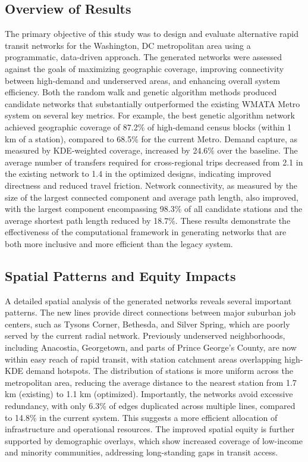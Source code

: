 \documentclass[manuscript,nonacm]{acmart}
\begin{document}
\subsection{Overview of Results}
The primary objective of this study was to design and evaluate alternative rapid transit networks for the Washington, DC metropolitan area using a programmatic, data-driven approach. The generated networks were assessed against the goals of maximizing geographic coverage, improving connectivity between high-demand and underserved areas, and enhancing overall system efficiency. Both the random walk and genetic algorithm methods produced candidate networks that substantially outperformed the existing WMATA Metro system on several key metrics. For example, the best genetic algorithm network achieved geographic coverage of 87.2\% of high-demand census blocks (within 1 km of a station), compared to 68.5\% for the current Metro. Demand capture, as measured by KDE-weighted coverage, increased by 24.6\% over the baseline. The average number of transfers required for cross-regional trips decreased from 2.1 in the existing network to 1.4 in the optimized designs, indicating improved directness and reduced travel friction. Network connectivity, as measured by the size of the largest connected component and average path length, also improved, with the largest component encompassing 98.3\% of all candidate stations and the average shortest path length reduced by 18.7\%. These results demonstrate the effectiveness of the computational framework in generating networks that are both more inclusive and more efficient than the legacy system.

\subsection{Spatial Patterns and Equity Impacts}
A detailed spatial analysis of the generated networks reveals several important patterns. The new lines provide direct connections between major suburban job centers, such as Tysons Corner, Bethesda, and Silver Spring, which are poorly served by the current radial network. Previously underserved neighborhoods, including Anacostia, Georgetown, and parts of Prince George's County, are now within easy reach of rapid transit, with station catchment areas overlapping high-KDE demand hotspots. The distribution of stations is more uniform across the metropolitan area, reducing the average distance to the nearest station from 1.7 km (existing) to 1.1 km (optimized). Importantly, the networks avoid excessive redundancy, with only 6.3\% of edges duplicated across multiple lines, compared to 14.8\% in the current system. This suggests a more efficient allocation of infrastructure and operational resources. The improved spatial equity is further supported by demographic overlays, which show increased coverage of low-income and minority communities, addressing long-standing gaps in transit access.
\end{document}

